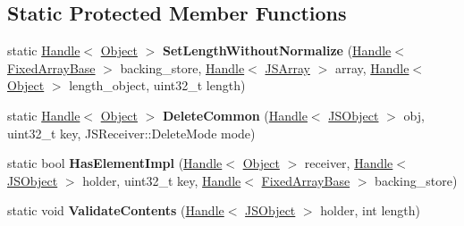 \subsection*{Static Protected Member Functions}
\begin{DoxyCompactItemize}
\item 
\hypertarget{classv8_1_1internal_1_1_fast_elements_accessor_a2391e35e8bedbd20af482b51082a78cc}{}static \hyperlink{classv8_1_1internal_1_1_handle}{Handle}$<$ \hyperlink{classv8_1_1internal_1_1_object}{Object} $>$ {\bfseries Set\+Length\+Without\+Normalize} (\hyperlink{classv8_1_1internal_1_1_handle}{Handle}$<$ \hyperlink{classv8_1_1internal_1_1_fixed_array_base}{Fixed\+Array\+Base} $>$ backing\+\_\+store, \hyperlink{classv8_1_1internal_1_1_handle}{Handle}$<$ \hyperlink{classv8_1_1internal_1_1_j_s_array}{J\+S\+Array} $>$ array, \hyperlink{classv8_1_1internal_1_1_handle}{Handle}$<$ \hyperlink{classv8_1_1internal_1_1_object}{Object} $>$ length\+\_\+object, uint32\+\_\+t length)\label{classv8_1_1internal_1_1_fast_elements_accessor_a2391e35e8bedbd20af482b51082a78cc}

\item 
\hypertarget{classv8_1_1internal_1_1_fast_elements_accessor_adaac2b54b54be4fb20a1bc414d65389b}{}static \hyperlink{classv8_1_1internal_1_1_handle}{Handle}$<$ \hyperlink{classv8_1_1internal_1_1_object}{Object} $>$ {\bfseries Delete\+Common} (\hyperlink{classv8_1_1internal_1_1_handle}{Handle}$<$ \hyperlink{classv8_1_1internal_1_1_j_s_object}{J\+S\+Object} $>$ obj, uint32\+\_\+t key, J\+S\+Receiver\+::\+Delete\+Mode mode)\label{classv8_1_1internal_1_1_fast_elements_accessor_adaac2b54b54be4fb20a1bc414d65389b}

\item 
\hypertarget{classv8_1_1internal_1_1_fast_elements_accessor_ae8df256ce4b8d445b71c44fa3ac3c119}{}static bool {\bfseries Has\+Element\+Impl} (\hyperlink{classv8_1_1internal_1_1_handle}{Handle}$<$ \hyperlink{classv8_1_1internal_1_1_object}{Object} $>$ receiver, \hyperlink{classv8_1_1internal_1_1_handle}{Handle}$<$ \hyperlink{classv8_1_1internal_1_1_j_s_object}{J\+S\+Object} $>$ holder, uint32\+\_\+t key, \hyperlink{classv8_1_1internal_1_1_handle}{Handle}$<$ \hyperlink{classv8_1_1internal_1_1_fixed_array_base}{Fixed\+Array\+Base} $>$ backing\+\_\+store)\label{classv8_1_1internal_1_1_fast_elements_accessor_ae8df256ce4b8d445b71c44fa3ac3c119}

\item 
\hypertarget{classv8_1_1internal_1_1_fast_elements_accessor_a054075977f057b6ab523e15074577767}{}static void {\bfseries Validate\+Contents} (\hyperlink{classv8_1_1internal_1_1_handle}{Handle}$<$ \hyperlink{classv8_1_1internal_1_1_j_s_object}{J\+S\+Object} $>$ holder, int length)\label{classv8_1_1internal_1_1_fast_elements_accessor_a054075977f057b6ab523e15074577767}

\end{DoxyCompactItemize}
